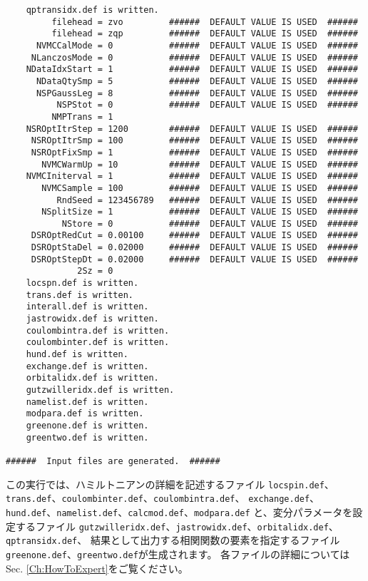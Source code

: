 \begin{verbatim}
    qptransidx.def is written.
         filehead = zvo         ######  DEFAULT VALUE IS USED  ######
         filehead = zqp         ######  DEFAULT VALUE IS USED  ######
      NVMCCalMode = 0           ######  DEFAULT VALUE IS USED  ######
     NLanczosMode = 0           ######  DEFAULT VALUE IS USED  ######
    NDataIdxStart = 1           ######  DEFAULT VALUE IS USED  ######
      NDataQtySmp = 5           ######  DEFAULT VALUE IS USED  ######
      NSPGaussLeg = 8           ######  DEFAULT VALUE IS USED  ######
          NSPStot = 0           ######  DEFAULT VALUE IS USED  ######
         NMPTrans = 1
    NSROptItrStep = 1200        ######  DEFAULT VALUE IS USED  ######
     NSROptItrSmp = 100         ######  DEFAULT VALUE IS USED  ######
     NSROptFixSmp = 1           ######  DEFAULT VALUE IS USED  ######
       NVMCWarmUp = 10          ######  DEFAULT VALUE IS USED  ######
    NVMCIniterval = 1           ######  DEFAULT VALUE IS USED  ######
       NVMCSample = 100         ######  DEFAULT VALUE IS USED  ######
          RndSeed = 123456789   ######  DEFAULT VALUE IS USED  ######
       NSplitSize = 1           ######  DEFAULT VALUE IS USED  ######
           NStore = 0           ######  DEFAULT VALUE IS USED  ######
     DSROptRedCut = 0.00100     ######  DEFAULT VALUE IS USED  ######
     DSROptStaDel = 0.02000     ######  DEFAULT VALUE IS USED  ######
     DSROptStepDt = 0.02000     ######  DEFAULT VALUE IS USED  ######
              2Sz = 0
    locspn.def is written.
    trans.def is written.
    interall.def is written.
    jastrowidx.def is written.
    coulombintra.def is written.
    coulombinter.def is written.
    hund.def is written.
    exchange.def is written.
    orbitalidx.def is written.
    gutzwilleridx.def is written.
    namelist.def is written.
    modpara.def is written.
    greenone.def is written.
    greentwo.def is written.

######  Input files are generated.  ######
\end{verbatim}
\normalsize

この実行では、ハミルトニアンの詳細を記述するファイル
\verb|locspin.def|、\verb|trans.def|、\verb|coulombinter.def|、\verb|coulombintra.def|、
\verb|exchange.def|、\verb|hund.def|、\verb|namelist.def|、\verb|calcmod.def|、\verb|modpara.def|
と、変分パラメータを設定するファイル
\verb|gutzwilleridx.def|、\verb|jastrowidx.def|、\verb|orbitalidx.def|、\verb|qptransidx.def|、
結果として出力する相関関数の要素を指定するファイル
\verb|greenone.def|、\verb|greentwo.def|が生成されます。
各ファイルの詳細についてはSec. \ref{Ch:HowToExpert}をご覧ください。

